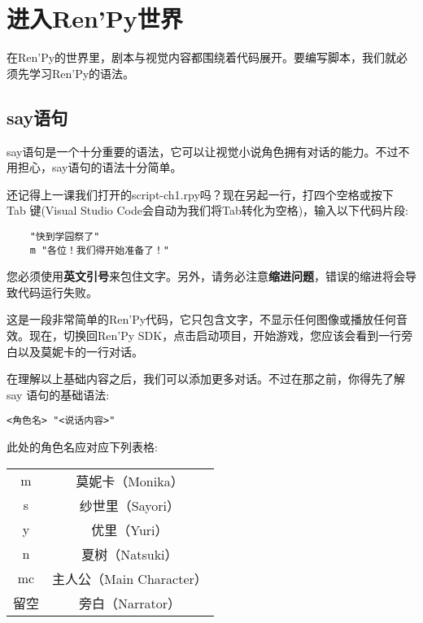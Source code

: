 \section{进入Ren'Py世界}
在Ren'Py的世界里，剧本与视觉内容都围绕着代码展开。要编写脚本，我们就必须先学习Ren'Py的语法。
\subsection{say语句}\label{subsec:3.2.1}
say语句是一个十分重要的语法，它可以让视觉小说角色拥有对话的能力。不过不用担心，say语句的语法十分简单。

还记得上一课我们打开的script-ch1.rpy吗？现在另起一行，打四个空格或按下 Tab 键(Visual Studio Code会自动为我们将Tab转化为空格)，输入以下代码片段:

\begin{lstlisting}
    "快到学园祭了"
    m "各位！我们得开始准备了！"
\end{lstlisting}

\begin{Warning}
您必须使用\textbf{英文引号}来包住文字。另外，请务必注意\textbf{缩进问题}，错误的缩进将会导致代码运行失败。
\end{Warning}

这是一段非常简单的Ren'Py代码，它只包含文字，不显示任何图像或播放任何音效。现在，切换回Ren'Py SDK，点击启动项目，开始游戏，您应该会看到一行旁白以及莫妮卡的一行对话。

在理解以上基础内容之后，我们可以添加更多对话。不过在那之前，你得先了解 say 语句的基础语法:

\begin{lstlisting}[numbers=none]
<角色名> "<说话内容>"
\end{lstlisting}


此处的角色名应对应下列表格:

\begin{center}
    \tabletail{\hline}
    \tablelasttail{\hline}
    \begin{supertabular}{|c|c|}
        \hline
        m & 莫妮卡（Monika）\\
        s & 纱世里（Sayori）\\
        y & 优里（Yuri）\\
        n & 夏树（Natsuki）\\
        mc & 主人公（Main Character）\\
        留空 & 旁白（Narrator）\\
        \hline
    \end{supertabular}
\end{center}

